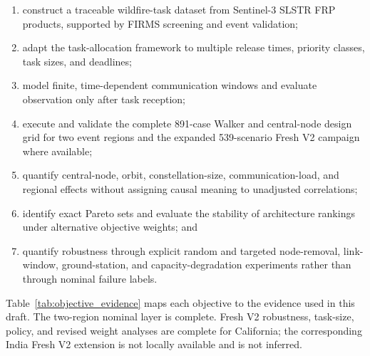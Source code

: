 \begin{enumerate}
\item construct a traceable wildfire-task dataset from Sentinel-3 SLSTR FRP products, supported by FIRMS screening and event validation;
\item adapt the task-allocation framework to multiple release times, priority classes, task sizes, and deadlines;
\item model finite, time-dependent communication windows and evaluate observation only after task reception;
\item execute and validate the complete 891-case Walker and central-node design grid for two event regions and the expanded 539-scenario Fresh V2 campaign where available;
\item quantify central-node, orbit, constellation-size, communication-load, and regional effects without assigning causal meaning to unadjusted correlations;
\item identify exact Pareto sets and evaluate the stability of architecture rankings under alternative objective weights; and
\item quantify robustness through explicit random and targeted node-removal, link-window, ground-station, and capacity-degradation experiments rather than through nominal failure labels.
\end{enumerate}

Table~\ref{tab:objective_evidence} maps each objective to the evidence used in this draft. The two-region nominal layer is complete. Fresh V2 robustness, task-size, policy, and revised weight analyses are complete for California; the corresponding India Fresh V2 extension is not locally available and is not inferred.

